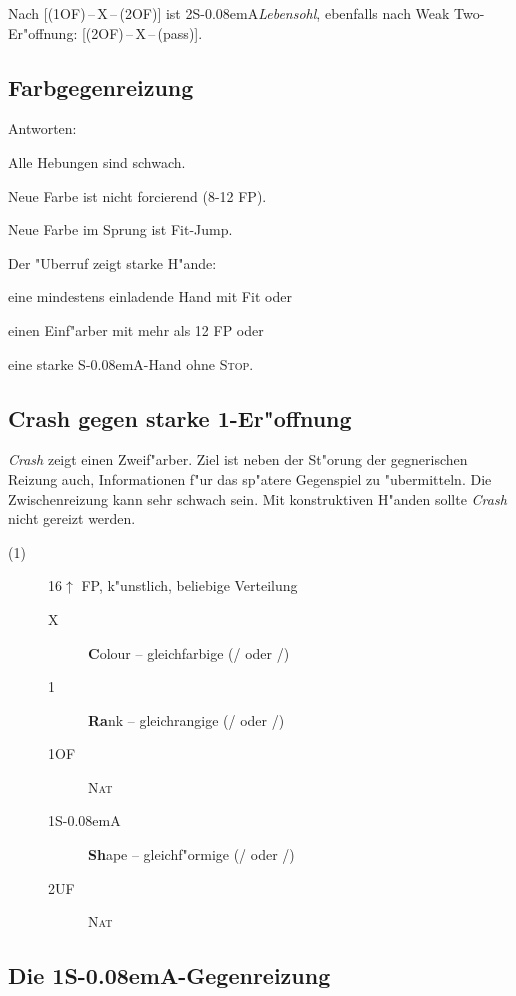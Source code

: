 \documentclass[11pt,german,twocolumn]{scrartcl}
\def\kar{\nobreak\hspace{\cardskip}\Di\xspace}
\def\tre{\nobreak\hspace{\cardskip}\Cl\xspace}
\def\pi{\Sp\xspace}
\def\co{\He\xspace}
\def\ka{\Di\xspace}
\def\tr{\Cl\xspace}
\def\pl{$\uparrow$\xspace}
\def\uf{\nobreak\hspace{\cardskip}\textsf{UF}\xspace}
\def\of{\nobreak\hspace{\cardskip}\textsf{OF}\xspace}
\def\sa{\nobreak\textsf{S\kern-0.08emA}\xspace}
\def\SA{\nobreak\hspace{\cardskip}\sa}
\def\kontra{\textsf{X}\xspace}
\def\sep{\,--\,}
\newcommand{\conv}[1]{\emph{#1}}
\def\nat{\textsc{Nat}\xspace}
\def\stp{\textsc{Stop}\xspace}
\def\bdsc{\begin{description}}
\def\edsc{\end{description}}
\newcommand{\Index}[1]{#1\index{#1}}
\begin{document}
Nach [(1\of){}\sep\kontra{}\sep(2\of)] ist 2\SA \Index{\conv{Lebensohl}}, ebenfalls
nach \Index{Weak Two}-Er"offnung: [(2\of){}\sep\kontra{}\sep(pass)].

\subsection{Farbgegenreizung}

Antworten:

\begin{compactitem}
\item Alle Hebungen sind schwach.
\item Neue Farbe ist nicht forcierend (8-12 FP).
\item Neue Farbe im Sprung ist Fit-Jump.
\item Der "Uberruf zeigt starke H"ande:
  \begin{compactitem}
  \item eine mindestens einladende Hand mit Fit oder
  \item einen Einf"arber mit mehr als 12 FP oder
  \item eine starke \sa-Hand ohne \stp.
  \end{compactitem}
\end{compactitem}

\subsection{Crash gegen starke 1\tre-Er"offnung}

\conv{Crash} zeigt einen Zweif"arber. Ziel ist neben der St"orung der
gegnerischen Reizung auch, Informationen f"ur das sp"atere Gegenspiel
zu "ubermitteln.  Die Zwischenreizung kann sehr schwach sein.  Mit
konstruktiven H"anden sollte \conv{Crash} nicht gereizt werden.

\bdsc
\item[(1\tre)] 16\pl FP, k"unstlich, beliebige Verteilung
\bdsc
\item[\kontra] \textbf{C}olour -- gleichfarbige (\tr/\pi oder \ka/\co)
\item[1\kar] \textbf{Ra}nk -- gleichrangige (\tr/\ka oder \co/\pi)
\item[1\of] \nat
\item[1\SA] \textbf{Sh}ape -- gleichf"ormige (\tr/\co oder \ka/\pi)
\item[2\uf] \nat
\edsc
\edsc

\subsection{Die 1\SA-Gegenreizung}
\end{document}
